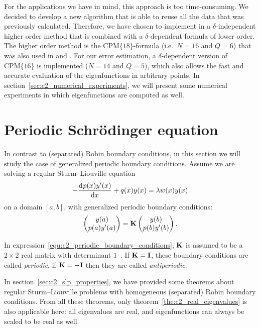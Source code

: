 For the applications we have in mind, this approach is too time-consuming. We decided to develop a new algorithm that is able to reuse all the data that was previously calculated. Therefore, we have chosen to implement in  a $\delta$-independent higher order method that is combined with a $\delta$-dependent formula of lower order. The higher order method is the $\text{CPM}\{18\}$-formula (i.e.\ $N=16$ and $Q=6$) that was also used in \matslise{} and . For our error estimation, a $\delta$-dependent version of $\text{CPM}\{16\}$ is implemented ($N=14$ and $Q=5)$, which also allows the fast and accurate evaluation of the eigenfunctions in arbitrary points. In section~\ref{sec:c2_numerical_experiments}, we will present some numerical experiments in which eigenfunctions are computed as well.

\section{Periodic \texorpdfstring{\oneD}{1D} Schrödinger equation}\label{sec:c2_periodic}

In contrast to (separated) Robin boundary conditions, in this section we will study the case of generalized periodic boundary conditions. Assume we are solving a regular Sturm--Liouville equation
\begin{equation}\label{equ:c2_periodic_sturm_liouville}
    -\dv[]{p(x)y'(x)}{x} + q(x)y(x) = \lambda w(x) y(x)
\end{equation}
on a domain $[a, b]$, with generalized periodic boundary conditions:
\begin{equation}\label{equ:c2_periodic_boundary_conditions}
    \begin{pmatrix}
        y(a) \\ p(a)y'(a)
    \end{pmatrix} = \vb{K}\begin{pmatrix}
        y(b) \\ p(b)y'(b)
    \end{pmatrix}\text{.}
\end{equation}

In expression~\eqref{equ:c2_periodic_boundary_conditions}, $\vb{K}$ is assumed to be a $2 \times 2$ real matrix with determinant $1$~\cite{binding_prufer_2013}. If $\vb{K} = \vb{I}$, these boundary conditions are called \emph{periodic}, if $\vb{K} = -\vb{I}$ then they are called \emph{antiperiodic}.

In section~\ref{sec:c2_slp_properties}, we have provided some theorems about regular Sturm--Liouville problems with homogeneous (separated) Robin boundary conditions. From all these theorems, only theorem~\ref{the:c2_real_eigenvalues} is also applicable here: all eigenvalues are real, and eigenfunctions can always be scaled to be real as well.

